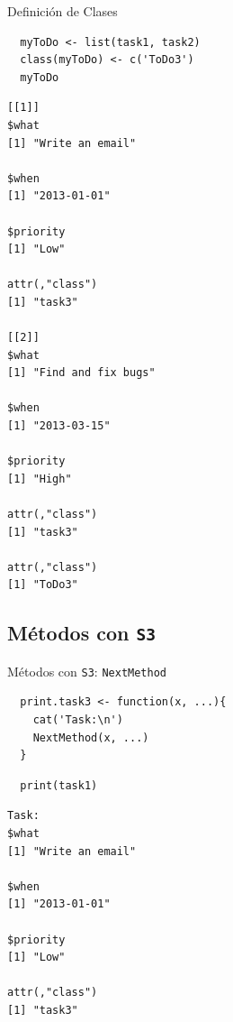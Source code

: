 \documentclass[xcolor={usenames,svgnames,dvipsnames}]{beamer}
\begin{document}
\begin{frame}[fragile,label={sec:orgheadline8}]{Definición de Clases}
 \lstset{language=R,label= ,caption= ,captionpos=b,numbers=none}
\begin{lstlisting}
  myToDo <- list(task1, task2)
  class(myToDo) <- c('ToDo3')
  myToDo
\end{lstlisting}

\begin{verbatim}
[[1]]
$what
[1] "Write an email"

$when
[1] "2013-01-01"

$priority
[1] "Low"

attr(,"class")
[1] "task3"

[[2]]
$what
[1] "Find and fix bugs"

$when
[1] "2013-03-15"

$priority
[1] "High"

attr(,"class")
[1] "task3"

attr(,"class")
[1] "ToDo3"
\end{verbatim}
\end{frame}

\subsection{Métodos con \texttt{S3}}
\label{sec:orgheadline15}

\begin{frame}[fragile,label={sec:orgheadline10}]{Métodos con \texttt{S3}: \texttt{NextMethod}}
 \lstset{language=R,label= ,caption= ,captionpos=b,numbers=none}
\begin{lstlisting}
  print.task3 <- function(x, ...){
    cat('Task:\n')
    NextMethod(x, ...)
  }
\end{lstlisting}

\lstset{language=R,label= ,caption= ,captionpos=b,numbers=none}
\begin{lstlisting}
  print(task1)
\end{lstlisting}

\begin{verbatim}
Task:
$what
[1] "Write an email"

$when
[1] "2013-01-01"

$priority
[1] "Low"

attr(,"class")
[1] "task3"
\end{verbatim}
\end{frame}
\end{document}
